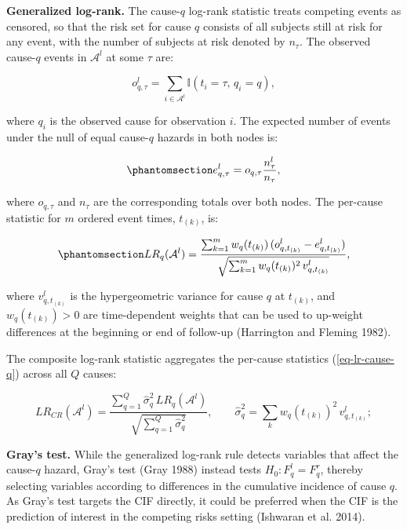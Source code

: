 \documentclass[
  letterpaper,
  krantz2]{style/krantz}
\begin{document}
\textbf{Generalized log-rank.}
The cause-\(q\) log-rank statistic treats competing events as censored,
so that the risk set for cause \(q\) consists of all subjects still at
risk for any event, with the number of subjects at risk denoted by
\(n_{\tau}\). The observed cause-\(q\) events in \(\mathcal{A}^l\) at
some \(\tau\) are:

\[
o^l_{q,{\tau}} = \sum_{i \in \mathcal{A}^l} \mathbb{I}(t_i = \tau,\, q_i = q),
\]

where \(q_i\) is the observed cause for observation \(i\). The expected
number of events under the null of equal cause-\(q\) hazards in both
nodes is:

\begin{equation}\phantomsection\label{eq-cr-exp}{
e^l_{q,{\tau}} = o_{q,{\tau}}\frac{n^l_{\tau}}{n_{\tau}},
}\end{equation}

where \(o_{q,{\tau}}\) and \(n_{\tau}\) are the corresponding totals
over both nodes. The per-cause statistic for \(m\) ordered event times,
\(t_{(k)}\), is:

\begin{equation}\phantomsection\label{eq-lr-cause-q}{
LR_q(\mathcal{A}^l) = \frac{\sum^m_{k=1} w_q({t_{(k)}})\,(o^l_{q,{t_{(k)}}} - e^l_{q,{t_{(k)}}})}{\sqrt{\sum^m_{k=1} w_q({t_{(k)}})^2\, v^l_{q,{t_{(k)}}}}},
}\end{equation}

where \(v^l_{q,{t_{(k)}}}\) is the hypergeometric variance for cause
\(q\) at \(t_{(k)}\), and \(w_q(t_{(k)}) > 0\) are time-dependent
weights that can be used to up-weight differences at the beginning or
end of follow-up (Harrington and Fleming 1982).

The composite log-rank statistic aggregates the per-cause statistics
(\ref{eq-lr-cause-q}) across all \(Q\) causes:

\[
LR_{CR}(\mathcal{A}^l) = \frac{\sum_{q=1}^Q \hat{\sigma}_q^2 \, LR_q(\mathcal{A}^l)}{\sqrt{\sum_{q=1}^Q \hat{\sigma}_q^2}}, \qquad \hat{\sigma}_q^2 = \sum_k w_q({t_{(k)}})^2\, v^l_{q,{t_{(k)}}};
\]

\textbf{Gray's test.}
 While the
generalized log-rank rule detects variables that affect the cause-\(q\)
hazard, Gray's test (Gray 1988) instead tests \(H_0: F_q^l = F_q^r\),
thereby selecting variables according to differences in the cumulative
incidence of cause \(q\). As Gray's test targets the CIF directly, it
could be preferred when the CIF is the prediction of interest in the
competing risks setting (Ishwaran et al. 2014).
\end{document}
